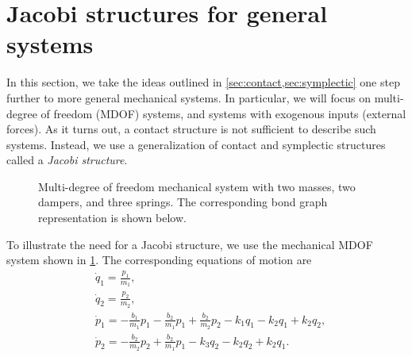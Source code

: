 \section{Jacobi structures for general systems}
\label{sec:jacobi}
In this section, we take the ideas outlined in \cref{sec:contact,sec:symplectic} one step further to more general mechanical systems. In particular, we will focus on multi-degree of freedom (MDOF) systems, and systems with exogenous inputs (external forces). As it turns out, a contact structure is not sufficient to describe such systems. Instead, we use a generalization of contact and symplectic structures called a \emph{Jacobi structure}.

\begin{figure}[ht!]
    \centering
    
    \caption{Multi-degree of freedom mechanical system with two masses, two dampers, and three springs. The corresponding bond graph representation is shown below.}
    \label{fig:mdof_oscillator}
\end{figure}

To illustrate the need for a Jacobi structure, we use the mechanical MDOF system shown in \cref{fig:mdof_oscillator}. The corresponding equations of motion are
\begin{equation}
    \begin{split}
        &\dot{q}_1 = \frac{p_1}{m_1}, \\
        &\dot{q}_2 = \frac{p_2}{m_2}, \\
        &\dot{p}_1 = -\frac{b_1}{m_1}p_1 - \frac{b_2}{m_1}p_1 + \frac{b_2}{m_2}p_2 - k_1 q_1 - k_2 q_1 + k_2 q_2, \\
        &\dot{p}_2 =  - \frac{b_2}{m_2}p_2 + \frac{b_2}{m_1}p_1 - k_3 q_2 - k_2 q_2 + k_2 q_1. \\
    \end{split}
\end{equation}

